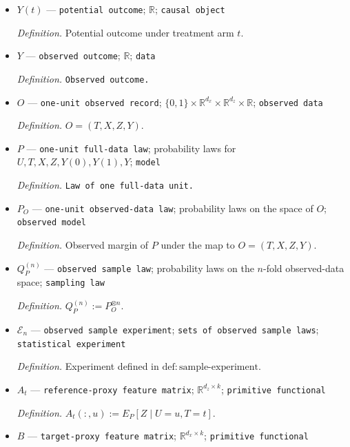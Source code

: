 \documentclass{article}
\begin{document}
\begin{itemize}
  \par\smallskip\noindent\emph{Definition.} \texttt{Observed reference-\allowbreak{}proxy feature vector.}
  \item \(Y(t)\) --- \texttt{potential outcome}; \(\mathbb R\); \texttt{causal object}
  \par\smallskip\noindent\emph{Definition.} Potential outcome under treatment arm \(t\).
  \item \(Y\) --- \texttt{observed outcome}; \(\mathbb R\); \texttt{data}
  \par\smallskip\noindent\emph{Definition.} \texttt{Observed outcome.}
  \item \(O\) --- \texttt{one-\allowbreak{}unit observed record}; \(\{0,1\}\times\mathbb R^{d_x}\times\mathbb R^{d_z}\times\mathbb R\); \texttt{observed data}
  \par\smallskip\noindent\emph{Definition.} \(O=(T,X,Z,Y)\).
  \item \(P\) --- \texttt{one-\allowbreak{}unit full-\allowbreak{}data law}; probability laws for \(U,T,X,Z,Y(0),Y(1),Y\); \texttt{model}
  \par\smallskip\noindent\emph{Definition.} \texttt{Law of one full-\allowbreak{}data unit.}
  \item \(P_O\) --- \texttt{one-\allowbreak{}unit observed-\allowbreak{}data law}; probability laws on the space of \(O\); \texttt{observed model}
  \par\smallskip\noindent\emph{Definition.} Observed margin of \(P\) under the map to \(O=(T,X,Z,Y)\).
  \item \(Q_P^{(n)}\) --- \texttt{observed sample law}; probability laws on the \(n\)-fold observed-data space; \texttt{sampling law}
  \par\smallskip\noindent\emph{Definition.} \(Q_P^{(n)}:=P_O^{\otimes n}\).
  \item \(\mathcal E_n\) --- \texttt{observed sample experiment}; \texttt{sets of observed sample laws}; \texttt{statistical experiment}
  \par\smallskip\noindent\emph{Definition.} Experiment defined in \(\mathrm{def:sample\text{-}experiment}\).
  \item \(A_t\) --- \texttt{reference-\allowbreak{}proxy feature matrix}; \(\mathbb R^{d_z\times k}\); \texttt{primitive functional}
  \par\smallskip\noindent\emph{Definition.} \(A_t(:,u):=E_P[Z\mid U=u,T=t]\).
  \item \(B\) --- \texttt{target-\allowbreak{}proxy feature matrix}; \(\mathbb R^{d_x\times k}\); \texttt{primitive functional}

\end{itemize}
\end{document}
